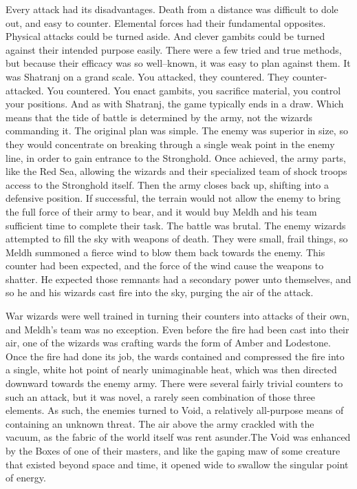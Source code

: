 Every attack had its disadvantages. Death from a distance was difficult to dole out, and easy to counter. Elemental forces had their fundamental opposites. Physical attacks could be turned aside. And clever gambits could be turned against their intended purpose easily. There were a few tried and true methods, but because their efficacy was so well\mbox{--}known, it was easy to plan against them.
\SmallVSpace
It was Shatranj on a grand scale. You attacked, they countered. They counter-attacked. You countered. You enact gambits, you sacrifice material, you control your positions. And as with Shatranj, the game typically ends in a draw. Which means that the tide of battle is determined by the army, not the wizards commanding it.
\SomeVSpace
\SomeVSpace
The original plan was simple. The enemy was superior in size, so they would concentrate on breaking through a single weak point in the enemy line, in order to gain entrance to the Stronghold. Once achieved, the army parts, like the Red Sea, allowing the wizards and their specialized team of shock troops access to the Stronghold itself. Then the army closes back up, shifting into a defensive position. If successful, the terrain would not allow the enemy to bring the full force of their army to bear, and it would buy Meldh and his team sufficient time to complete their task.
\SmallVSpace
The battle was brutal. The enemy wizards attempted to fill the sky with weapons of death. They were small, frail things, so Meldh summoned a fierce wind to blow them back towards the enemy. This counter had been expected, and the force of the wind cause the weapons to shatter. He expected those remnants had a secondary power unto themselves, and so he and his wizards cast fire into the sky, purging the air of the attack.

War wizards were well trained in turning their counters into attacks of their own, and Meldh’s team was no exception. Even before the fire had been cast into their air, one of the wizards was crafting wards the form of Amber and Lodestone. Once the fire had done its job, the wards contained and compressed the fire into a single, white hot point of nearly unimaginable heat, which was then directed downward towards the enemy army.
\SmallVSpace
There were several fairly trivial counters to such an attack, but it was novel, a rarely seen combination of those three elements. As such, the enemies turned to Void, a relatively all-purpose means of containing an unknown threat. The air above the army crackled with the vacuum, as the fabric of the world itself was rent asunder.\SmallVSpace The Void was enhanced by the Boxes of one of their masters, and like the gaping maw of some creature that existed beyond space and time, it opened wide to swallow the singular point of energy.

